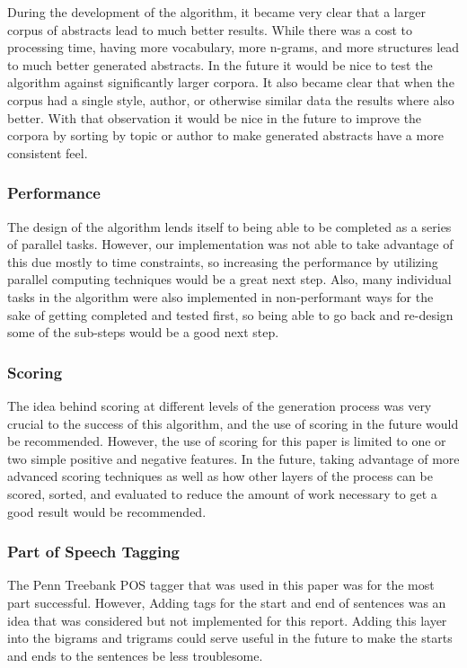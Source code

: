 \documentclass[letterpaper, 10 pt, conference]{ieeeconf}  %
\begin{document}
During the development of the algorithm, it became very clear that a larger corpus of abstracts lead to much better results. While there was a cost to processing time, having more vocabulary, more n-grams, and more structures lead to much better generated abstracts. In the future it would be nice to test the algorithm against significantly larger corpora. It also became clear that
when the corpus had a single style, author, or otherwise similar data the results where also better. With that observation it would be nice in the future to improve the corpora by sorting by topic or author to make generated abstracts have a more consistent feel.

\subsubsection{Performance}

The design of the algorithm lends itself to being able to be completed as a series of parallel tasks. However, our implementation was not able to take advantage of this due mostly to time constraints, so increasing the performance by utilizing parallel computing techniques would be a great next step. Also, many individual tasks in the algorithm were also implemented in non-performant ways for the sake of getting completed and tested first, so being able to go back and re-design some of the sub-steps would be a good next step.

\subsubsection{Scoring}

The idea behind scoring at different levels of the generation process was very crucial to the success of this algorithm, and the use of scoring in the future would be recommended. However, the use of scoring for this paper is limited to one or two simple positive and negative features. In the future, taking advantage of more advanced scoring techniques as well as how other layers of the process can be scored, sorted, and evaluated to reduce the amount of work necessary to get a good result would be recommended.

\subsubsection{Part of Speech Tagging}

The Penn Treebank POS tagger that was used in this paper was for the most part successful. However, Adding tags for the start and end of sentences was an idea that was considered but not implemented for this report. Adding this layer into the bigrams and trigrams could serve useful in the future to make the starts and ends to the sentences be less troublesome.
\end{document}
